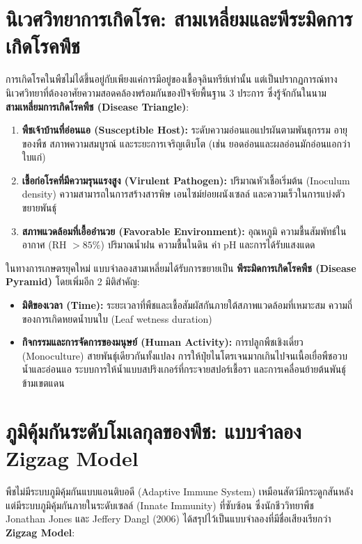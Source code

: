 \section{นิเวศวิทยาการเกิดโรค: สามเหลี่ยมและพีระมิดการเกิดโรคพืช}

การเกิดโรคในพืชไม่ได้ขึ้นอยู่กับเพียงแค่การมีอยู่ของเชื้อจุลินทรีย์เท่านั้น แต่เป็นปรากฏการณ์ทางนิเวศวิทยาที่ต้องอาศัยความสอดคล้องพร้อมกันของปัจจัยพื้นฐาน 3 ประการ ซึ่งรู้จักกันในนาม \textbf{สามเหลี่ยมการเกิดโรคพืช (Disease Triangle)}:

\begin{enumerate}
    \item \textbf{พืชเจ้าบ้านที่อ่อนแอ (Susceptible Host):} ระดับความอ่อนแอแปรผันตามพันธุกรรม อายุของพืช สภาพความสมบูรณ์ และระยะการเจริญเติบโต (เช่น ยอดอ่อนและผลอ่อนมักอ่อนแอกว่าใบแก่)
    \item \textbf{เชื้อก่อโรคที่มีความรุนแรงสูง (Virulent Pathogen):} ปริมาณหัวเชื้อเริ่มต้น (Inoculum density) ความสามารถในการสร้างสารพิษ เอนไซม์ย่อยผนังเซลล์ และความเร็วในการแบ่งตัวขยายพันธุ์
    \item \textbf{สภาพแวดล้อมที่เอื้ออำนวย (Favorable Environment):} อุณหภูมิ ความชื้นสัมพัทธ์ในอากาศ (RH $> 85\%$) ปริมาณน้ำฝน ความชื้นในดิน ค่า pH และการได้รับแสงแดด
\end{enumerate}

ในทางการเกษตรยุคใหม่ แบบจำลองสามเหลี่ยมได้รับการขยายเป็น \textbf{พีระมิดการเกิดโรคพืช (Disease Pyramid)} โดยเพิ่มอีก 2 มิติสำคัญ:
\begin{itemize}
    \item \textbf{มิติของเวลา (Time):} ระยะเวลาที่พืชและเชื้อสัมผัสกันภายใต้สภาพแวดล้อมที่เหมาะสม ความถี่ของการเกิดหยดน้ำบนใบ (Leaf wetness duration)
    \item \textbf{กิจกรรมและการจัดการของมนุษย์ (Human Activity):} การปลูกพืชเชิงเดี่ยว (Monoculture) สายพันธุ์เดียวกันทั้งแปลง การให้ปุ๋ยไนโตรเจนมากเกินไปจนเนื้อเยื่อพืชอวบน้ำและอ่อนแอ ระบบการให้น้ำแบบสปริงเกอร์ที่กระจายสปอร์เชื้อรา และการเคลื่อนย้ายต้นพันธุ์ข้ามเขตแดน
\end{itemize}

\section{ภูมิคุ้มกันระดับโมเลกุลของพืช: แบบจำลอง Zigzag Model}

พืชไม่มีระบบภูมิคุ้มกันแบบแอนติบอดี (Adaptive Immune System) เหมือนสัตว์มีกระดูกสันหลัง แต่มีระบบภูมิคุ้มกันภายในระดับเซลล์ (Innate Immunity) ที่ซับซ้อน ซึ่งนักชีววิทยาพืช Jonathan Jones และ Jeffery Dangl (2006) ได้สรุปไว้เป็นแบบจำลองที่มีชื่อเสียงเรียกว่า \textbf{Zigzag Model}:


